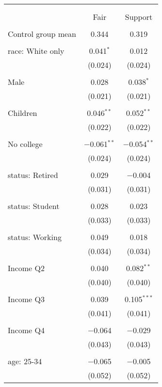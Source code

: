 
\begin{tabular}{@{\extracolsep{5pt}}lcc} 
\\[-1.8ex]\hline 
\hline \\[-1.8ex] 
\\[-1.8ex] & Fair & Support \\ 
\hline \\[-1.8ex] 
 Control group mean & 0.344 & 0.319  \\ \hline \\[-1.8ex] race: White only & 0.041$^{*}$ & 0.012 \\ 
  & (0.024) & (0.024) \\ 
  & & \\ 
 Male & 0.028 & 0.038$^{*}$ \\ 
  & (0.021) & (0.021) \\ 
  & & \\ 
 Children & 0.046$^{**}$ & 0.052$^{**}$ \\ 
  & (0.022) & (0.022) \\ 
  & & \\ 
 No college & $-$0.061$^{**}$ & $-$0.054$^{**}$ \\ 
  & (0.024) & (0.024) \\ 
  & & \\ 
 status: Retired & 0.029 & $-$0.004 \\ 
  & (0.031) & (0.031) \\ 
  & & \\ 
 status: Student & 0.028 & 0.023 \\ 
  & (0.033) & (0.033) \\ 
  & & \\ 
 status: Working & 0.049 & 0.018 \\ 
  & (0.034) & (0.034) \\ 
  & & \\ 
 Income Q2 & 0.040 & 0.082$^{**}$ \\ 
  & (0.040) & (0.040) \\ 
  & & \\ 
 Income Q3 & 0.039 & 0.105$^{***}$ \\ 
  & (0.041) & (0.041) \\ 
  & & \\ 
 Income Q4 & $-$0.064 & $-$0.029 \\ 
  & (0.043) & (0.043) \\ 
  & & \\ 
 age: 25-34 & $-$0.065 & $-$0.005 \\ 
  & (0.052) & (0.052) \\ 

\end{tabular}
